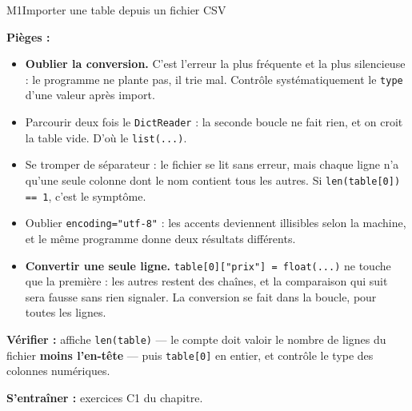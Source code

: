 \begin{fichemethode}{M1}{Importer une table depuis un fichier CSV}

\textbf{Pièges :}
\begin{itemize}
  \item \textbf{Oublier la conversion.} C'est l'erreur la plus fréquente et la plus
    silencieuse : le programme ne plante pas, il trie mal. Contrôle systématiquement le
    \lstinline{type} d'une valeur après import.
  \item Parcourir deux fois le \lstinline{DictReader} : la seconde boucle ne fait rien, et
    on croit la table vide. D'où le \lstinline{list(...)}.
  \item Se tromper de séparateur : le fichier se lit sans erreur, mais chaque ligne n'a
    qu'une seule colonne dont le nom contient tous les autres. Si
    \lstinline{len(table[0]) == 1}, c'est le symptôme.
  \item Oublier \lstinline{encoding="utf-8"} : les accents deviennent illisibles selon la
    machine, et le même programme donne deux résultats différents.
  \item \textbf{Convertir une seule ligne.} \lstinline{table[0]["prix"] = float(...)} ne
    touche que la première : les autres restent des chaînes, et la comparaison qui suit sera
    fausse sans rien signaler. La conversion se fait dans la boucle, pour toutes les lignes.
\end{itemize}

\textbf{Vérifier :} affiche \lstinline{len(table)} — le compte doit valoir le nombre de
lignes du fichier \textbf{moins l'en-tête} — puis \lstinline{table[0]} en entier, et
contrôle le type des colonnes numériques.

\textbf{S'entraîner :} exercices C1 du chapitre.
\end{fichemethode}
